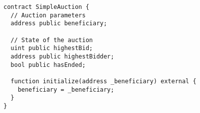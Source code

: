 \begin{lstlisting}[language=Solidity]
contract SimpleAuction {
  // Auction parameters
  address public beneficiary;
  
  // State of the auction
  uint public highestBid;
  address public highestBidder;
  bool public hasEnded;

  function initialize(address _beneficiary) external {
    beneficiary = _beneficiary;
  }
}
\end{lstlisting}